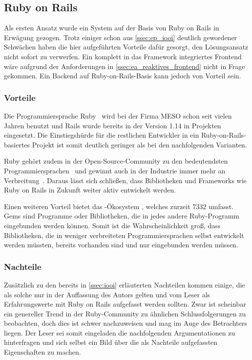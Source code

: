 \subsection{Ruby on Rails}
\label{ssec:kl_ruby_on_rails}

Als ersten Ansatz wurde ein System auf der Basis von Ruby on Rails in Erwägung
gezogen.  Trotz einiger schon aus
\cref{ssec:ep_iooi} deutlich gewordener
Schwächen haben die hier aufgeführten Vorteile dafür gesorgt, den Lösungsansatz
nicht sofort zu verwerfen.  Ein komplett in das Framework integriertes Frontend
wäre aufgrund der Anforderungen in \cref{ssec:ea_reaktives_frontend} nicht in
Frage gekommen.  Ein Backend auf Ruby-on-Rails-Basis kann jedoch von Vorteil
sein.

\subsubsection{Vorteile}
\label{sssec:elr_vorteile}

Die Programmiersprache Ruby~\cite{ruby} wird bei der Firma MESO schon seit vielen
Jahren benutzt und Rails wurde bereits in der Version 1.14 in Projekten
eingesetzt.  Die Einstiegshürde für die restlichen Entwickler in ein
Ruby-on-Rails-basiertes Projekt ist somit deutlich geringer als bei den
nachfolgenden Varianten.

Ruby gehört zudem in der Open-Source-Community zu den bedeutendsten
Programmiersprachen~\cite{ghlangtrends} und gewinnt auch in der Industrie immer
mehr an Verbreitung~\cite{tiobe}.  Daraus lässt sich schließen, dass
Bibliotheken und Frameworks wie Ruby on Rails in Zukunft weiter aktiv entwickelt
werden.

Einen weiteren Vorteil bietet das -Ökosystem
\cite{rubygems}, welches zurzeit 7332  umfasst.  Gems sind
Programme oder Bibliotheken, die in jedes andere Ruby-Programm eingebunden
werden können.  Somit ist die Wahrscheinlichkeit groß, dass Bibliotheken, die
in weniger verbreiteten Programmiersprachen selbst entwickelt werden müssten,
bereits vorhanden sind und nur eingebunden werden müssen.

\subsubsection{Nachteile}
\label{sssec:elr_nachteile}

Zusätzlich zu den bereits in \cref{ssec:iooi} erläuterten Nachteilen kommen
einige, die als solche nur in der Auffassung des Autors gelten und vom Leser
als Erfahrungswerte mit Ruby on Rails aufgefasst werden sollten.  Zwar ist
scheinbar ein genereller Trend in der Ruby-Community zu ähnlichen
Schlussfolgerungen zu beobachten, doch dies ist schwer nachzuweisen und mag im
Auge des Betrachters liegen.  Der Leser sei somit eingeladen die nachfolgenden
Argumentationen zu hinterfragen und sich selbst ein Bild über die als Nachteile
aufgefassten Eigenschaften zu machen.

